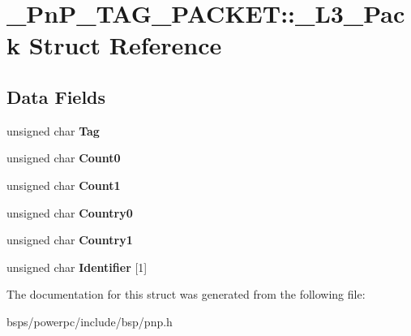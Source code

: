 \hypertarget{struct__PnP__TAG__PACKET_1_1__L3__Pack}{}\section{\+\_\+\+Pn\+P\+\_\+\+T\+A\+G\+\_\+\+P\+A\+C\+K\+ET\+::\+\_\+\+L3\+\_\+\+Pack Struct Reference}
\label{struct__PnP__TAG__PACKET_1_1__L3__Pack}
\subsection*{Data Fields}
\begin{DoxyCompactItemize}
\item 
\mbox{\label{struct__PnP__TAG__PACKET_1_1__L3__Pack_a939595bb7fef046058aa9dcfb5c50f53}} 
unsigned char {\bfseries Tag}
\item 
\mbox{\label{struct__PnP__TAG__PACKET_1_1__L3__Pack_aa289aae780bb79d4bd7dbb5a66e0a0ba}} 
unsigned char {\bfseries Count0}
\item 
\mbox{\label{struct__PnP__TAG__PACKET_1_1__L3__Pack_a146aa1418ea86688e376c00742551e22}} 
unsigned char {\bfseries Count1}
\item 
\mbox{\label{struct__PnP__TAG__PACKET_1_1__L3__Pack_a5c728c3486ac10773c98ad2c1ef85e33}} 
unsigned char {\bfseries Country0}
\item 
\mbox{\label{struct__PnP__TAG__PACKET_1_1__L3__Pack_a1f5fdc1315c91c817cd612099768414e}} 
unsigned char {\bfseries Country1}
\item 
\mbox{\label{struct__PnP__TAG__PACKET_1_1__L3__Pack_ab98652ea8cc8ceb25d4940a930c0e402}} 
unsigned char {\bfseries Identifier} \mbox{[}1\mbox{]}
\end{DoxyCompactItemize}


The documentation for this struct was generated from the following file\+:\begin{DoxyCompactItemize}
\item 
bsps/powerpc/include/bsp/pnp.\+h\end{DoxyCompactItemize}
